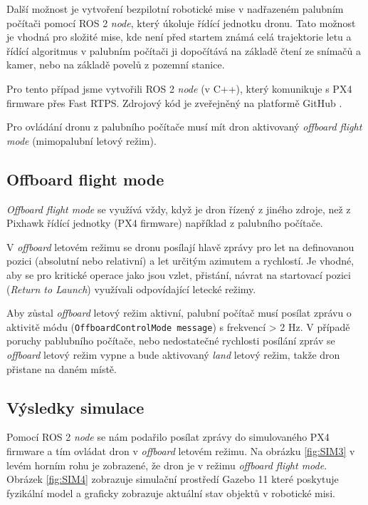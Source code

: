 Další možnost je vytvoření bezpilotní robotické mise v nadřazeném palubním počítači pomocí ROS 2 \textit{node}, který úkoluje řídící jednotku dronu. Tato možnost je vhodná pro složité mise, kde není před startem známá celá trajektorie letu a řídící algoritmus v palubním počítači ji dopočítává na základě čtení ze snímačů a kamer, nebo na základě povelů z pozemní stanice.

Pro tento případ jsme vytvořili ROS 2 \textit{node} (v C++), který komunikuje s PX4 firmware přes Fast RTPS. Zdrojový kód je zveřejněný na platformě GitHub \cite{GIT}.

Pro ovládání dronu z palubního počítače musí mít dron aktivovaný \textit{offboard flight mode} (mimopalubní letový režim).

\subsection{Offboard flight mode}

\textit{Offboard flight mode} se využívá vždy, když je dron řízený z jiného zdroje, než z Pixhawk řídící jednotky (PX4 firmware) například z palubního počítače. 

V \textit{offboard} letovém režimu se dronu posílají hlavě zprávy pro let na definovanou pozici (absolutní nebo relativní) a let určitým azimutem a rychlostí. Je vhodné, aby se pro kritické operace jako jsou vzlet, přistání, návrat na startovací pozici (\textit{Return to Launch}) využívali odpovídající letecké režimy.

Aby zůstal \textit{offboard} letový režim aktivní, palubní počítač musí posílat zprávu o aktivitě módu (\texttt{OffboardControlMode message}) s frekvencí > 2 Hz. V případě poruchy pablubního počítače, nebo nedostatečné rychlosti posílání zpráv se \textit{offboard} letový režim vypne a bude aktivovaný \textit{land} letový režim, takže dron přistane na daném místě. \cite{PX4docs}

\subsection{Výsledky simulace}

Pomocí ROS 2 \textit{node} se nám podařilo posílat zprávy do simulovaného PX4 firmware a tím ovládat dron v \textit{offboard} letovém režimu. Na obrázku \ref{fig:SIM3} v levém horním rohu je zobrazené, že dron je v režimu \textit{offboard flight mode}. Obrázek \ref{fig:SIM4} zobrazuje simulační prostředí Gazebo 11 které poskytuje fyzikální model  a graficky zobrazuje aktuální stav objektů v robotické misi.

